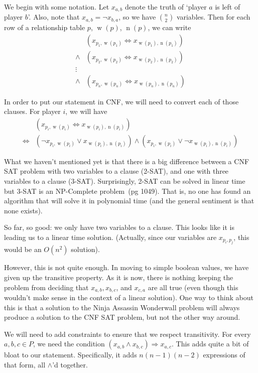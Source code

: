 \documentclass[12pt,x11names, rgb]{article}
\DeclareMathOperator{\w}{w}
\DeclareMathOperator{\n}{n}
\begin{document}
    We begin with some notation. Let $x_{a,b}$ denote the truth of `player $a$ is left of player $b$'. Also, note that $x_{a,b} = \lnot x_{b,a}$, so we have $\binom{n}{2}$ variables. Then for each row of a relationship table $p$, $\w(p)$, $\n(p)$, we can write
        \begin{align*}
                    & (x_{p_1, \w(p_1)} \Leftrightarrow x_{\w(p_1), \n(p_1)})\\
            \wedge  & (x_{p_2, \w(p_2)} \Leftrightarrow x_{\w(p_2), \n(p_2)})\\
            \vdots  &\\
            \wedge  & (x_{p_n, \w(p_n)} \Leftrightarrow x_{\w(p_n), \n(p_n)})
        \end{align*}

    In order to put our statement in CNF, we will need to convert each of those clauses. For player $i$, we will have 
        \begin{align*}
            & (x_{p_i, \w(p_i)} \Leftrightarrow x_{\w(p_i), \n(p_i)})\\
            \Leftrightarrow & (\lnot x_{p_i, \w(p_i)} \vee x_{\w(p_i), \n(p_i)}) \wedge (x_{p_i, \w(p_i)} \vee \lnot x_{\w(p_i), \n(p_i)})
        \end{align*}

    What we haven't mentioned yet is that there is a big difference between a CNF SAT problem with two variables to a clause (2-SAT), and one with three variables to a clause (3-SAT). Surprisingly, 2-SAT can be solved in linear time but 3-SAT is an NP-Complete problem~\cite{clrs}(pg 1049). That is, no one has found an algorithm that will solve it in polynomial time (and the general sentiment is that none exists).

    So far, so good: we only have two variables to a clause. This looks like it is leading us to a linear time solution. (Actually, since our variables are $x_{p_i, p_j}$, this would be an $O(n^2)$ solution). 

    However, this is not quite enough. In moving to simple boolean values, we have given up the transitive property. As it is now, there is nothing keeping the problem from deciding that $x_{a,b}, x_{b,c}$, and $x_{c,a}$ are all true (even though this wouldn't make sense in the context of a linear solution). One way to think about this is that a solution to the Ninja Assassin Wonderwall problem will always produce a solution to the CNF SAT problem, but not the other way around.

    We will need to add constraints to ensure that we respect transitivity. For every $a,b,c \in P$, we need the condition $(x_{a,b} \wedge x_{b,c}) \Rightarrow x_{a,c}$. This adds quite a bit of bloat to our statement. Specifically, it adds $n(n-1)(n-2)$ expressions of that form, all $\wedge$'d together.
\end{document}
